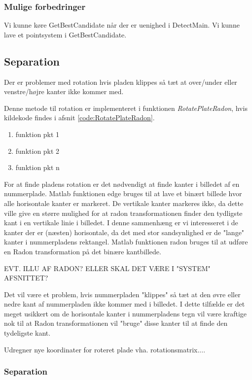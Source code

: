 \subsubsection{Mulige forbedringer}
Vi kunne køre GetBestCandidate når der er uenighed i DetectMain.
Vi kunne lave et pointsystem i GetBestCandidate.

\subsection{Separation}
\label{sec:implementation/sep/rotation}

Der er problemer med rotation hvis pladen klippes så tæt at over/under eller venstre/højre kanter ikke kommer med.

Denne metode til rotation er implementeret i funktionen \textit{RotatePlateRadon}, hvis kildekode findes i afsnit \vref{code:RotatePlateRadon}.

\begin{enumerate}
\item funktion pkt 1
\item funktion pkt 2
\item funktion pkt n
\end{enumerate}

For at finde pladens rotation er det nødvendigt at finde kanter i billedet af en nummerplade. Matlab funktionen edge bruges til at lave et binært billede hvor alle horisontale kanter er markeret. De vertikale kanter markeres ikke, da dette ville give en større mulighed for at radon transformationen finder den tydligste kant i en vertikale linie i billedet. I denne sammenhæng er vi interesseret i de kanter der er (næsten) horisontale, da det med stor sandsynlighed er de "lange" kanter i nummerpladens rektangel. Matlab funktionen radon bruges til at udføre en Radon transformation på det binære kantbillede.

EVT. ILLU AF RADON? ELLER SKAL DET VÆRE I "SYSTEM" AFSNITTET?

Det vil være et problem, hvis nummerpladen "klippes" så tæt at den øvre eller nedre kant af nummerpladen ikke kommer med i billedet. I dette tilfælde er det meget usikkert om de horisontale kanter i nummerpladens tegn vil være kraftige nok til at Radon transformationen vil "bruge" disse kanter til at finde den tydeligste kant.

Udregner nye koordinater for roteret plade vha. rotationsmatrix....

\subsubsection{Separation}

